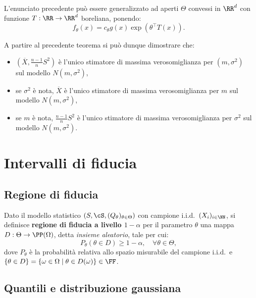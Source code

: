 \begin{multicols*}{2}
\begin{remark}
    L'enunciato precedente può essere generalizzato ad aperti $\Theta$ convessi in $\RR^d$
    con funzione $T : \RR \to \RR^d$ boreliana, ponendo:
    \[
        f_\theta(x) = c_\theta g(x) \exp\left(\theta^\top T(x)\right).
    \]
\end{remark}

\begin{remark}
    A partire al precedente teorema si può dunque dimostrare che:
    \begin{itemize}
        \item $(\overline{X}, \frac{n-1}{n} S^2)$ è l'unico stimatore di massima verosomiglianza per $(m, \sigma^2)$ sul
        modello $N(m, \sigma^2)$,
        \item se $\sigma^2$ è nota, $\overline{X}$ è l'unico stimatore di massima verosomiglianza per
        $m$ sul modello $N(m, \sigma^2)$,
        \item se $m$ è nota, $\frac{n-1}{n} S^2$ è l'unico stimatore di massima verosomiglianza per
        $\sigma^2$ sul modello $N(m, \sigma^2)$.
    \end{itemize}
\end{remark}

\section{Intervalli di fiducia}

\subsection{Regione di fiducia}

\begin{definition}
    Dato il modello statistico $(S, \cS, (Q_\theta)_{\theta \in \Theta})$ con campione
    i.i.d.~$(X_i)_{i \in \NN}$, si definisce \textbf{regione di fiducia a livello $1-\alpha$}
    per il parametro $\theta$ una mappa $D : \Theta \to \PP(\Omega)$, detta \textit{insieme aleatorio}, tale per cui:
    \[
        P_\theta(\theta \in D) \geq 1 - \alpha, \quad \forall \theta \in \Theta,
    \]
    dove $P_\theta$ è la probabilità relativa allo spazio misurabile del campione i.i.d.~e
    $\{\theta \in D\} = \{\omega \in \Omega \mid \theta \in D(\omega)\} \in \FF$.
\end{definition}

\subsection{Quantili e distribuzione gaussiana}


\end{multicols*}
